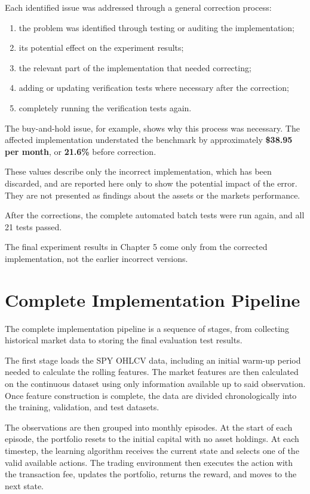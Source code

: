 Each identified issue was addressed through a general correction
process:

\begin{enumerate}
\def\labelenumi{\arabic{enumi}.}
\item
  the problem was identified through testing or auditing the
  implementation;
\item
  its potential effect on the experiment results;
\item
  the relevant part of the implementation that needed correcting;
\item
  adding or updating verification tests where necessary after the
  correction;
\item
  completely running the verification tests again.
\end{enumerate}

The buy-and-hold issue, for example, shows why this process was
necessary. The affected implementation understated the benchmark by
approximately \textbf{\$38.95 per month}, or \textbf{21.6\%} before
correction.

These values describe only the incorrect implementation, which has been
discarded, and are reported here only to show the potential impact of
the error. They are not presented as findings about the
asset\textquotesingle s or the market\textquotesingle s performance.

After the corrections, the complete automated batch tests were run
again, and all 21 tests passed.

The final experiment results in Chapter 5 come only from the corrected
implementation, not the earlier incorrect versions.

\section{Complete Implementation Pipeline}

The complete implementation pipeline is a sequence of stages, from
collecting historical market data to storing the final evaluation test
results.

The first stage loads the SPY OHLCV data, including an initial warm-up
period needed to calculate the rolling features. The market features are
then calculated on the continuous dataset using only information
available up to said observation. Once feature construction is complete,
the data are divided chronologically into the training, validation, and
test datasets.

The observations are then grouped into monthly episodes. At the start of
each episode, the portfolio resets to the initial capital with no asset
holdings. At each timestep, the learning algorithm receives the current
state and selects one of the valid available actions. The trading
environment then executes the action with the transaction fee, updates
the portfolio, returns the reward, and moves to the next state.


